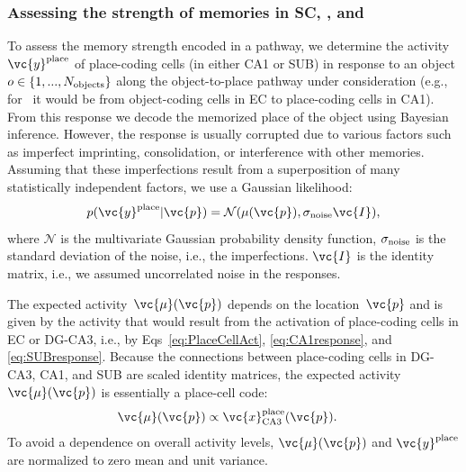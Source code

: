 \subsubsection{Assessing the strength of memories in SC, \ppca, and \ppsub}
To assess the memory strength encoded in a pathway, we determine the activity $\vc{y}^{\mathrm{place}}$ of place-coding cells (in either CA1 or SUB) in response to an object $o \in \{1,...,N_{\rm objects}\}$ along the object-to-place pathway under consideration (e.g., for \ppca~it would be from object-coding cells in EC to place-coding cells in CA1). From this response we decode the memorized place of the object using Bayesian inference. However, the response is usually corrupted due to various factors such as imperfect imprinting, consolidation, or interference with other memories. Assuming that these imperfections result from a superposition of many statistically independent factors, we use a Gaussian likelihood:
\begin{equation}
p(\vc{y}^{\mathrm{place}}|\vc{p}) = \mathcal{N}({\mu(\vc{p})}, \sigma_{\rm noise} \vc{I}),
\end{equation}
where $\mathcal{N}$ is the multivariate Gaussian probability density function, $\sigma_{\rm noise}$ is the standard deviation of the noise, i.e., the imperfections. $\vc{I}$ is the identity matrix, i.e., we assumed uncorrelated noise in the responses.

The expected activity~$\vc{\mu}(\vc{p})$ depends on the location~$\vc{p}$ and is given by the activity that would result from the activation of place-coding cells in EC or DG-CA3, i.e., by Eqs~\eqref{eq:PlaceCellAct}, \eqref{eq:CA1response}, and \eqref{eq:SUBresponse}. Because the connections between place-coding cells in DG-CA3, CA1, and SUB are scaled identity matrices, the expected activity~$\vc{\mu}(\vc{p})$ is essentially a place-cell code:
\begin{align}
\vc{\mu}(\vc{p}) & \propto \vc{x}_{{\rm CA3}}^{\mathrm{place}}(\vc{p}).
\end{align}
To avoid a dependence on overall activity levels, $\vc{\mu}(\vc{p})$ and $\vc{y}^{\mathrm{place}}$ are normalized to zero mean and unit variance.

